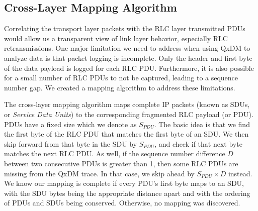 \subsection{Cross-Layer Mapping Algorithm}\label{sec:cross.layer.algo}

Correlating the transport layer packets with the RLC layer transmitted PDUs would allow us a transparent view of link layer behavior, especially RLC retransmissions.  One major limitation we need to address when using QxDM to analyze data is that packet logging is incomplete. Only the header and first byte of the data payload is logged for each RLC PDU. Furthermore, it is also possible for a small number of RLC PDUs to not be captured, leading to a sequence number gap. We created a mapping algorithm to address these limitations.

The cross-layer mapping algorithm maps complete IP packets (known as SDUs, or \textit{Service Data Units}) to the corresponding fragmented RLC payload (or PDU).  PDUs have a fixed size which we denote as $S_{PDU}$.  The basic idea is that we find the first byte of the RLC PDU that matches the first byte of an SDU.  We then skip forward from that byte in the SDU by $S_{PDU}$, and check if that next byte matches the next RLC PDU.  As well, if the sequence number difference $D$ between two consecutive PDUs is greater than 1, then some RLC PDUs are missing from the QxDM trace.  In that case, we skip ahead by $S_{PDU} \times D$ instead.  We know our mapping is complete if every PDU's first byte maps to an SDU, with the SDU bytes being the appropriate distance apart and with the ordering of PDUs and SDUs being conserved.  Otherwise, no mapping was discovered.



